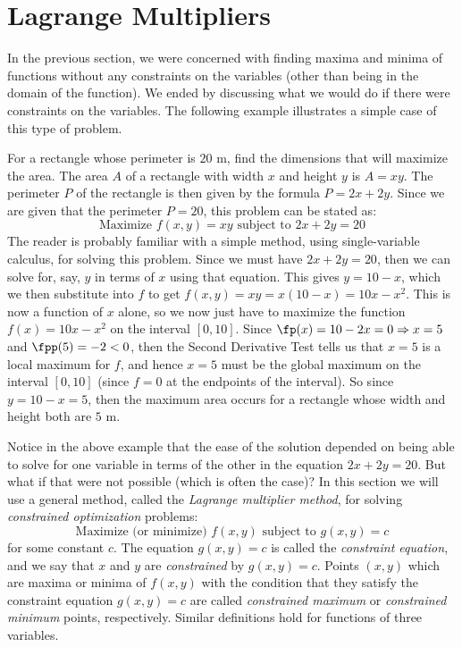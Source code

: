 \section{Lagrange Multipliers}\label{sec:lagrange}


In the previous section, we were concerned with finding maxima and minima of functions without any constraints on the variables (other than being in the domain of the function). We ended by discussing what we would do if there were constraints on the variables. The following example illustrates a simple case of this type of problem.

\begin{example}\label{exmp_consimple}
For a rectangle whose perimeter is $20$ m, find the dimensions that will maximize the area.
\solution
The area $A$ of a rectangle with width $x$ and height $y$ is $A = xy$. The perimeter $P$ of the rectangle is then given by the formula $P = 2x + 2y$. Since we are given that the perimeter $P = 20$, this problem can be stated as:
\[\text{Maximize }f(x,y) = xy\text{ subject to }2x + 2y = 20\]
The reader is probably familiar with a simple method, using single-variable calculus, for solving this problem. Since we must have $2x+2y=20$, then we can solve for, say, $y$ in terms of $x$ using that equation. This gives $y = 10 - x$, which we then substitute into $f$ to get $f(x,y) = xy = x(10-x) = 10x - x^2$. This is now a function of $x$ alone, so we now just have to maximize the function $f(x) = 10x - x^2$ on the interval $[0,10]$. Since $\fp(x) = 10-2x = 0 \Rightarrow x =5$ and $\fpp(5) = -2 < 0$, then the Second Derivative Test tells us that $x=5$ is a local maximum for $f$, and hence $x=5$ must be the global maximum on the interval $[0,10]$ (since $f = 0$ at the endpoints of the interval). So since $y=10-x =5$, then the maximum area occurs for a rectangle whose width and height both are $5$ m.
\end{example}

Notice in the above example that the ease of the solution depended on being able to solve for one variable in terms of the other in the equation $2x+2y=20$. But what if that were not possible (which is often the case)? In this section we will use a general method, called the \emph{Lagrange multiplier method}, for solving \emph{constrained optimization} problems:
%
%
\[
 \text{Maximize (or minimize) }f(x,y)\text{ subject to }g(x,y) = c
\]
for some constant $c$.
The equation $g(x,y) = c$ is called the \emph{constraint equation}, and we say that $x$ and $y$ are \emph{constrained} by $g(x,y) = c$. Points $(x,y)$ which are maxima or minima of $f(x,y)$ with the condition that they satisfy the constraint equation $g(x,y)=c$ are called \emph{constrained maximum} or \emph{constrained minimum} points, respectively. Similar definitions hold for functions of three variables.

